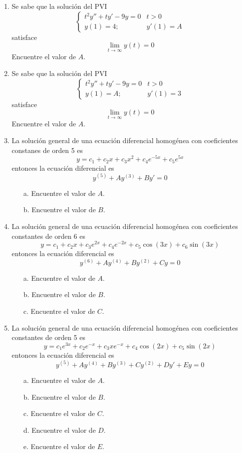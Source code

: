 
\begin{enumerate}
    \item Se sabe que la solución del PVI
    $$\begin{cases}
        t^2y'' + ty'- 9y = 0 & t >0 \\
        y(1) = 4; & y'(1)=A
    \end{cases}$$
    satisface $$\lim_{t \to \infty} y(t) = 0$$
    Encuentre el valor de $A$.
    \item Se sabe que la solución del PVI
    $$\begin{cases}
        t^2y'' + ty' -9y = 0 & t >0 \\
        y(1) = A; & y'(1)=3
    \end{cases}$$
    satisface $$\lim_{t \to \infty} y(t) = 0$$
    Encuentre el valor de $A$.
    \item La solución general de una ecuación diferencial homogénea con coeficientes constanes de orden 5 es
    $$y= c_1 + c_2x + c_3x^2+c_4e^{-5x}+c_5e^{5x}$$
    entonces la ecuación diferencial es
    $$y^{(5)}+ Ay^{(3)} + By' = 0$$
    \begin{itemize}
        \item[a.] Encuentre el valor de $A$.
        \item[b.] Encuentre el valor de $B$.
    \end{itemize}
    
    \item La solución general de una ecuación diferencial homogénea con coeficientes constantes de orden 6 es
$$y = c_1 + c_2x + c_3e^{2x} + c_4e^{-2x} + c_5\cos(3x) + c_6\sin(3x)$$
entonces la ecuación diferencial es
$$y^{(6)} + Ay^{(4)} + By^{(2)} + Cy = 0$$
\begin{itemize}
    \item[a.] Encuentre el valor de $A$.
    \item[b.] Encuentre el valor de $B$.
    \item[c.] Encuentre el valor de $C$.
\end{itemize}
\item La solución general de una ecuación diferencial homogénea con coeficientes constantes de orden 5 es
$$y = c_1e^{3x} + c_2e^{-x} + c_3xe^{-x} + c_4\cos(2x) + c_5\sin(2x)$$
entonces la ecuación diferencial es
$$y^{(5)} + Ay^{(4)} + By^{(3)} + Cy^{(2)} + Dy' + Ey = 0$$
\begin{itemize}
    \item[a.] Encuentre el valor de $A$.
    \item[b.] Encuentre el valor de $B$.
    \item[c.] Encuentre el valor de $C$.
    \item[d.] Encuentre el valor de $D$.
    \item[e.] Encuentre el valor de $E$.
\end{itemize}


\end{enumerate}
